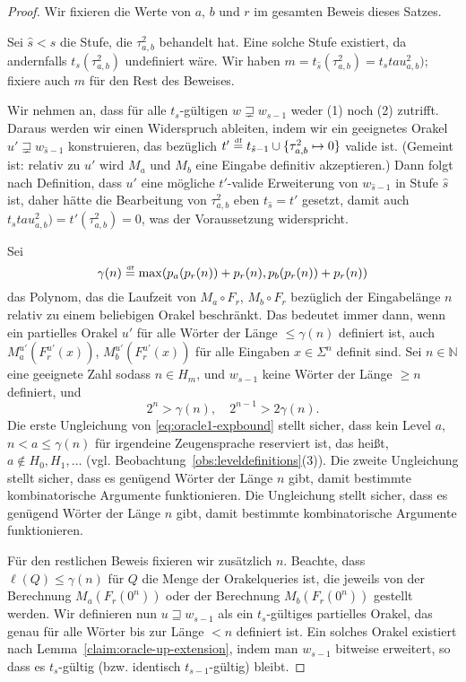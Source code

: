 \begin{proof}
Wir fixieren die Werte von $a$, $b$ und $r$ im gesamten Beweis dieses Satzes.

Sei $\hat{s} < s$ die Stufe, die $\tau^2_{a,b}$ behandelt hat.
Eine solche Stufe existiert, da andernfalls $t_{s}(\tau^2_{a,b})$ undefiniert wäre.
Wir haben $m = t_{\hat{s}}(\tau^2_{a,b}) = t_{s}tau^2_{a,b})$; fixiere auch $m$ für den Rest des Beweises.

Wir nehmen an, dass für alle $t_{s}$-gültigen $w\sqsupsetneq w_{s-1}$ weder (1) noch (2) zutrifft.
Daraus werden wir einen Widerspruch ableiten, indem wir ein geeignetes Orakel $u'\sqsupsetneq w_{\hat{s}-1}$ konstruieren, das bezüglich $t' \stackrel{\text{\smash{\tiny df}}}{=}  t_{\hat{s}-1}\cup \{\tau^2_{a,b}\mapsto 0\}$ valide ist. (Gemeint ist: relativ zu $u'$ wird $M_a$ und $M_b$ eine Eingabe definitiv akzeptieren.)
Dann folgt nach Definition, dass $u'$ eine mögliche $t'$-valide Erweiterung von $w_{\hat{s}-1}$ in Stufe $\hat{s}$ ist, daher hätte die Bearbeitung von $\tau^2_{a,b}$ eben $t_{\hat{s}}=t'$ gesetzt, damit auch $t_{s}tau^2_{a,b})=t'(\tau^2_{a,b})=0$, was der Voraussetzung widerspricht.

Sei
\begin{equation*} \gamma(n) \stackrel{\text{\smash{\tiny df}}}{=}  \max(p_a(p_r(n))+p_r(n), p_b(p_r(n))+p_r(n)) \end{equation*}
das Polynom, das die Laufzeit von $M_a\circ F_r$, $M_b\circ F_r$ bezüglich der Eingabelänge $n$ relativ zu einem beliebigen Orakel beschränkt.
Das bedeutet immer dann, wenn ein partielles Orakel $u'$ für alle Wörter der Länge $\leq \gamma(n)$ definiert ist, auch $M_a^{u'}(F_r^{u'}(x))$, $M_b^{u'}(F_r^{u'}(x))$ für alle Eingaben $x\in\Sigma^n$ definit sind.
Sei $n\in\mathbb N$ eine geeignete Zahl sodass $n\in H_m$, und $w_{s-1}$ keine Wörter der Länge $\geq n$ definiert,
und
\begin{equation}\label{eq:oracle1-expbound}
    2^n > \gamma(n),\quad  2^{n-1} > 2\gamma(n).
\end{equation}
Die erste Ungleichung von \eqref{eq:oracle1-expbound} stellt sicher, dass kein Level $a$, $n<a\leq \gamma(n)$ für irgendeine Zeugensprache reserviert ist, das heißt, $a\not\in H_0, H_1, \dots$ (vgl. Beobachtung~\ref{obs:leveldefinitions}(3)). Die zweite Ungleichung stellt sicher, dass es genügend Wörter der Länge $n$ gibt, damit bestimmte kombinatorische Argumente funktionieren.
Die Ungleichung stellt sicher, dass es genügend Wörter der Länge $n$ gibt, damit bestimmte kombinatorische Argumente funktionieren.

Für den restlichen Beweis fixieren wir zusätzlich $n$.
Beachte, dass $\ell(Q)\leq\gamma(n)$ für $Q$ die Menge der Orakelqueries ist, die jeweils von der Berechnung $M_a(F_r(0^n))$ oder der Berechnung $M_b(F_r(0^n))$ gestellt werden.
Wir definieren nun $u\sqsupseteq w_{s-1}$ als ein $t_{s}$-gültiges partielles Orakel, das genau für alle Wörter bis zur Länge $<n$ definiert ist. Ein solches Orakel existiert nach Lemma~\ref{claim:oracle-up-extension}, indem man $w_{s-1}$ bitweise erweitert, so dass es $t_{s}$-gültig (bzw. identisch $t_{s-1}$-gültig) bleibt.


\end{proof}
